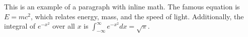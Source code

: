\documentclass[preview]{standalone}
\begin{document}
\begin{center}
This is an example of a paragraph with inline math. 
        The famous equation is $E = mc^2$, 
        which relates energy, mass, and the speed of light. 
        Additionally, the integral of $e^{-x^2}$ over all $x$ 
        is $\int_{-\infty}^{\infty} e^{-x^2} dx = \sqrt{\pi}$.
\end{center}
\end{document}
